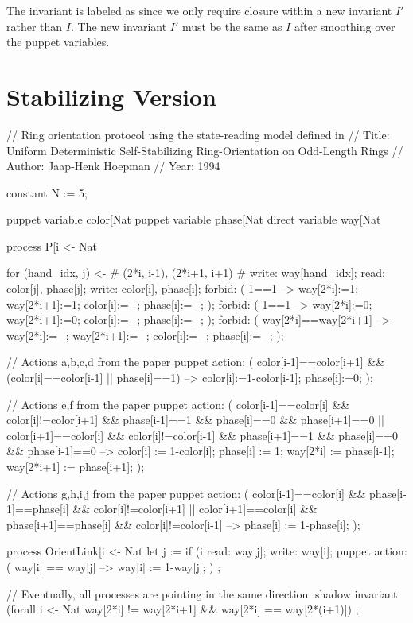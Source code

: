 The invariant is labeled as  since we only require closure within a new invariant $I'$ rather than $I$.
The new invariant $I'$ must be the same as $I$ after smoothing over the puppet variables.

\section{Stabilizing Version}
\begin{code}
// Ring orientation protocol using the state-reading model defined in
// Title: Uniform Deterministic Self-Stabilizing Ring-Orientation on Odd-Length Rings
// Author: Jaap-Henk Hoepman
// Year: 1994

constant N := 5;

puppet variable color[Nat %
puppet variable phase[Nat %
direct variable way[Nat %

process P[i <- Nat %
{
  for (hand_idx, j)  <- {# (2*i, i-1), (2*i+1, i+1) #}
  {
    write: way[hand_idx];
    read: color[j], phase[j];
  }
  write: color[i], phase[i];
  forbid: ( 1==1 --> way[2*i]:=1; way[2*i+1]:=1; color[i]:=_; phase[i]:=_; );
  forbid: ( 1==1 --> way[2*i]:=0; way[2*i+1]:=0; color[i]:=_; phase[i]:=_; );
  forbid: ( way[2*i]==way[2*i+1] --> way[2*i]:=_; way[2*i+1]:=_; color[i]:=_; phase[i]:=_; );

  // Actions a,b,c,d from the paper
  puppet action:
    ( color[i-1]==color[i+1] && (color[i]==color[i-1] || phase[i]==1)
     -->
      color[i]:=1-color[i-1];
      phase[i]:=0;
    );

  // Actions e,f from the paper
  puppet action:
    (    color[i-1]==color[i] && color[i]!=color[i+1] && phase[i-1]==1 && phase[i]==0 && phase[i+1]==0
      || color[i+1]==color[i] && color[i]!=color[i-1] && phase[i+1]==1 && phase[i]==0 && phase[i-1]==0
     -->
      color[i] := 1-color[i];
      phase[i] := 1;
      way[2*i] := phase[i-1];
      way[2*i+1] := phase[i+1];
    );

  // Actions g,h,i,j from the paper
  puppet action:
    (    color[i-1]==color[i] && phase[i-1]==phase[i] && color[i]!=color[i+1]
      || color[i+1]==color[i] && phase[i+1]==phase[i] && color[i]!=color[i-1]
     -->
      phase[i] := 1-phase[i];
    );
}

process OrientLink[i <- Nat %
{
  let j := if (i %
  read: way[j];
  write: way[i];
  puppet action:
    ( way[i] == way[j] --> way[i] := 1-way[j]; )
    ;
}

// Eventually, all processes are pointing in the same direction.
shadow invariant:
  (forall i <- Nat %
   way[2*i] != way[2*i+1]
   &&
   way[2*i] == way[2*(i+1)])
  ;
\end{code}



